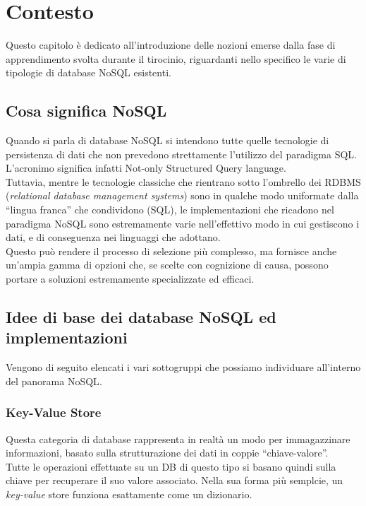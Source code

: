 
\chapter{Contesto}
\label{cap:contesto}

Questo capitolo è dedicato all'introduzione delle nozioni emerse dalla fase di apprendimento svolta durante il tirocinio, riguardanti nello specifico le varie di tipologie di database NoSQL esistenti.\\

\section{Cosa significa NoSQL}
Quando si parla di database NoSQL si intendono tutte quelle tecnologie di persistenza di dati che non prevedono strettamente l'utilizzo del paradigma \gls{SQL}\cite{site:mongoarticlenosql}. L'acronimo significa infatti Not-only Structured Query language.\\
Tuttavia, mentre le tecnologie classiche che rientrano sotto l'ombrello dei RDBMS (\textit{relational database management systems}) sono in qualche modo uniformate dalla ``lingua franca'' che condividono (\gls{SQL}), le implementazioni che ricadono nel paradigma NoSQL sono estremamente varie nell'effettivo modo in cui gestiscono i dati, e di conseguenza nei linguaggi che adottano.\\
Questo può rendere il processo di selezione più complesso, ma fornisce anche un'ampia gamma di opzioni che, se scelte con cognizione di causa, possono portare a soluzioni estremamente specializzate ed efficaci.\\


\section{Idee di base dei database NoSQL ed implementazioni}
Vengono di seguito elencati i vari sottogruppi che possiamo individuare all'interno del panorama NoSQL\cite{site:mongoarticletypes}.\\

\subsection{Key-Value Store}
Questa categoria di database rappresenta in realtà un modo per immagazzinare informazioni, basato sulla strutturazione dei dati in coppie ``chiave-valore''.\\
Tutte le operazioni effettuate su un DB di questo tipo si basano quindi sulla chiave per recuperare il suo valore associato. Nella sua forma più semplcie, un \textit{key-value} store funziona esattamente come un dizionario.\\

